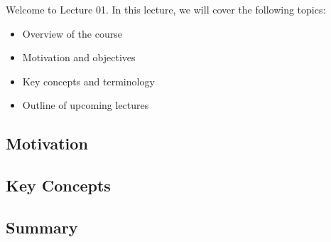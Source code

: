 
Welcome to Lecture 01. In this lecture, we will cover the following topics:

\begin{itemize}
    \item Overview of the course
    \item Motivation and objectives
    \item Key concepts and terminology
    \item Outline of upcoming lectures
\end{itemize}

\subsection{Motivation}


\subsection{Key Concepts}


\subsection{Summary}


